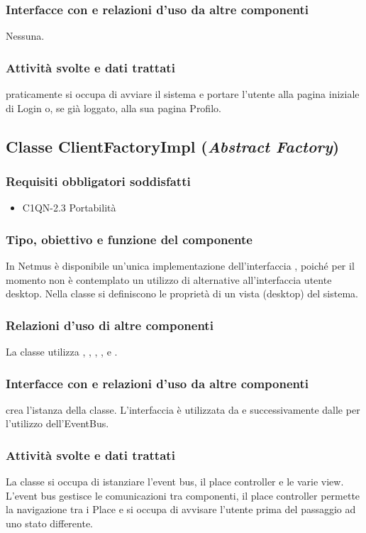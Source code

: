 \subsubsection*{Interfacce con e relazioni d'uso da altre componenti}
Nessuna.

\subsubsection*{Attivit\`a svolte e dati trattati}
 praticamente si occupa di avviare il sistema e portare l'utente alla
pagina iniziale di Login o, se gi\`a loggato, alla sua pagina Profilo.

\subsection{Classe ClientFactoryImpl (\emph{Abstract Factory})}
\subsubsection*{Requisiti obbligatori soddisfatti}
\begin{itemize}
	\item C1QN-2.3 Portabilit\`a
\end{itemize}
\subsubsection*{Tipo, obiettivo e funzione del componente}
In Netmus \`e disponibile un'unica implementazione dell'interfaccia
, poich\'e per il momento non \`e contemplato un utilizzo di
alternative all'interfaccia utente desktop.
Nella classe si definiscono le propriet\`a di un vista (desktop) del
sistema.

\subsubsection*{Relazioni d'uso di altre componenti}
La classe utilizza , , ,
,  e
.
\subsubsection*{Interfacce con e relazioni d'uso da altre componenti}
 crea l'istanza della classe. L'interfaccia  \`e
utilizzata da  e successivamente dalle  per
l'utilizzo dell'EventBus.
\subsubsection*{Attivit\`a svolte e dati trattati}
La classe si occupa di istanziare l'event bus, il place controller e le varie
view. L'event bus gestisce le comunicazioni tra componenti, il place
controller permette la navigazione tra i Place e si occupa di avvisare
l'utente prima del passaggio ad uno stato differente.


